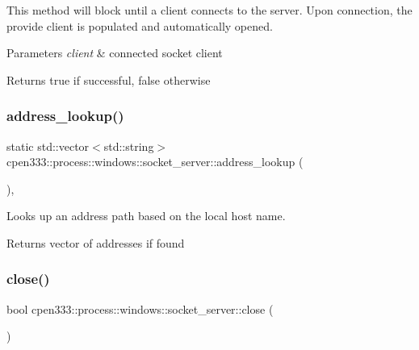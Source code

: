 This method will block until a client connects to the server. Upon connection, the provide client is populated and automatically opened.


\begin{DoxyParams}{Parameters}
{\em client} & connected socket client \\
\hline
\end{DoxyParams}
\begin{DoxyReturn}{Returns}
true if successful, false otherwise 
\end{DoxyReturn}
\mbox{\label{classcpen333_1_1process_1_1windows_1_1socket__server_ad4f6bbc14fc0f8716feea2a120873b50}} 
\subsubsection{\texorpdfstring{address\+\_\+lookup()}{address\_lookup()}}
{\footnotesize\ttfamily static std\+::vector$<$std\+::string$>$ cpen333\+::process\+::windows\+::socket\+\_\+server\+::address\+\_\+lookup (\begin{DoxyParamCaption}{ }\end{DoxyParamCaption})\hspace{0.3cm}{\ttfamily [inline]}, {\ttfamily [static]}}



Looks up an address path based on the local host name. 

\begin{DoxyReturn}{Returns}
vector of addresses if found 
\end{DoxyReturn}
\mbox{\label{classcpen333_1_1process_1_1windows_1_1socket__server_a5eddf38d7b08e27f2299a750f16eae66}} 
\subsubsection{\texorpdfstring{close()}{close()}}
{\footnotesize\ttfamily bool cpen333\+::process\+::windows\+::socket\+\_\+server\+::close (\begin{DoxyParamCaption}{ }\end{DoxyParamCaption})\hspace{0.3cm}{\ttfamily [inline]}}



